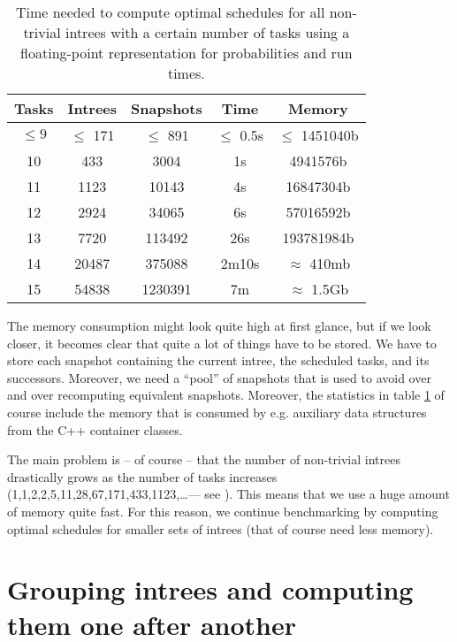 \begin{table}[ht]
  \centering
  \begin{tabular}[ht]{ccccc}
    Tasks & Intrees & Snapshots & Time & Memory \\
    \hline{}
    $\leq 9$ & $\leq$ 171 & $\leq$ 891 & $\leq$ 0.5s & $\leq$ 1451040b \\
    10 & 433 & 3004 & 1s & 4941576b \\
    11 & 1123 & 10143 & 4s & 16847304b \\
    12 & 2924 & 34065 & 6s & 57016592b \\
    13 & 7720 & 113492 & 26s & 193781984b \\
    14 & 20487 & 375088 & 2m10s & $\approx$ 410mb \\
    15 & 54838 & 1230391 & 7m & $\approx$ 1.5Gb \\
    
  \end{tabular}
  \caption{Time needed to compute optimal schedules for all non-trivial intrees with a certain number of tasks using a floating-point representation for probabilities and run times.}
  \label{tab:time-benchmark}
\end{table}

The memory consumption might look quite high at first glance, but if we look closer, it becomes clear that quite a lot of things have to be stored. We have to store each snapshot containing the current intree, the scheduled tasks, and its successors. Moreover, we need a ``pool'' of snapshots that is used to avoid over and over recomputing equivalent snapshots. Moreover, the statistics in table \ref{tab:time-benchmark} of course include the memory that is consumed by e.g. auxiliary data structures from the C++ container classes.

The main problem is -- of course -- that the number of non-trivial intrees drastically grows as the number of tasks increases (1,1,2,2,5,11,28,67,171,433,1123,\dots --- see \cite{oeisnumbernontrivialintrees}). This means that we use a huge amount of memory quite fast. For this reason, we continue benchmarking by computing optimal schedules for smaller sets of intrees (that of course need less memory).

\section{Grouping intrees and computing them one after another}
\label{sec:benchmarks-clustered-intrees}

